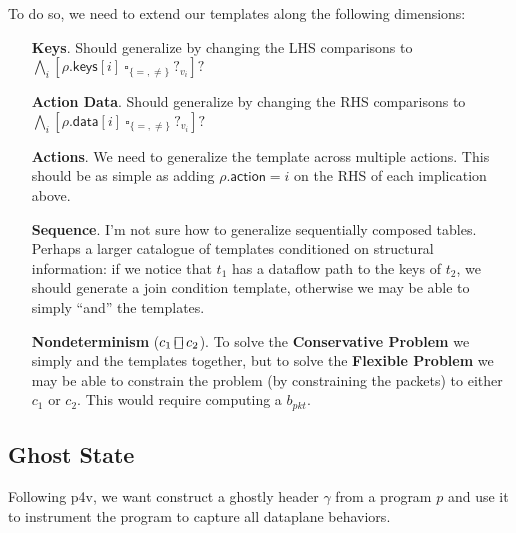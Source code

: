 \documentclass{article}
\newcommand{\action}{\mathsf{action}}
\newcommand{\keys}{\mathsf{keys}}
\newcommand{\data}{\mathsf{data}}
\newcommand{\choiceop}{\rotatebox[origin=c]{90}{$\sqsubset\!\!\!\sqsupset$}}
\newcommand{\choice}{\mathbin{\choiceop}}
\begin{document}
To do so, we need to extend our templates along the following dimensions:
\begin{enumerate}[align=left]
\item[\textbf{Keys}.] Should generalize by changing the LHS comparisons to $
  \bigwedge_i[\rho.\keys[i]~\square_{\{=,\neq\}}~?_{v_i}]?$
\item[\textbf{Action Data}.] Should generalize by changing the RHS comparisons to $\bigwedge_i[\rho.\data[i]~\square_{\{=,\neq\}}~?_{v_i}]?$
\item[\textbf{Actions}.] We need to generalize the template across multiple actions. This should be as simple as adding $\rho.\action = i$ on the RHS of each implication above.
\item[\textbf{Sequence}.] I'm not sure how to generalize sequentially composed tables.
  Perhaps a larger catalogue of templates conditioned on structural information:
  if we notice that $t_1$ has a dataflow path to the keys of $t_2$, we should
  generate a join condition template, otherwise we may be able to simply ``and'' the templates.

\item[\textbf{Nondeterminism} ($c_1 \choice c_2$).] To solve the \textbf{Conservative
  Problem} we simply and the templates together, but to solve the
  \textbf{Flexible Problem} we may be able to constrain the problem (by
  constraining the packets) to either $c_1$ or $c_2$. This would require
  computing a $b_{\textit{pkt}}$.
\end{enumerate}



\subsection{Ghost State}


Following p4v, we want construct a ghostly header $\gamma$ from a program $p$
and use it to instrument the program to capture all dataplane behaviors.
\end{document}
